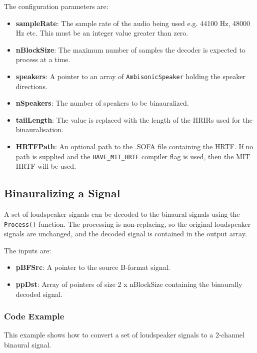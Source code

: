 \documentclass[12pt]{report}
\newcommand{\code}[1]{\texttt{#1}}
\begin{document}
The configuration parameters are:
\begin{itemize}
    \item \textbf{sampleRate}: The sample rate of the audio being used e.g. 44100 Hz, 48000 Hz etc. This must be an integer value greater than zero.
    \item \textbf{nBlockSize}: The maximum number of samples the decoder is expected to process at a time.
    \item \textbf{speakers}: A pointer to an array of \code{AmbisonicSpeaker} holding the speaker directions.
    \item \textbf{nSpeakers}: The number of speakers to be binauralized.
    \item \textbf{tailLength}: The value is replaced with the length of the HRIRs used for the binauralisation.
    \item \textbf{HRTFPath}: An optional path to the .SOFA file containing the HRTF. If no path is supplied and the \code{HAVE\_MIT\_HRTF} compiler flag is used, then the MIT HRTF will be used.
\end{itemize}

\subsection{Binauralizing a Signal}

A set of loudspeaker signals can be decoded to the binaural signals using the \code{Process()} function. The processing is non-replacing, so the original loudspeaker signals are unchanged, and the decoded signal is contained in the output array.

The inputs are:
\begin{itemize}
    \item \textbf{pBFSrc}: A pointer to the source B-format signal.
    \item \textbf{ppDst}: Array of pointers of size 2 x nBlockSize containing the binaurally decoded signal.
\end{itemize}

\subsubsection{Code Example}

This example shows how to convert a set of loudspeaker signals to a 2-channel binaural signal.
\end{document}
